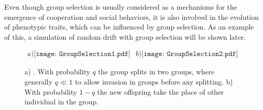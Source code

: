  
 Even though group selection is usually considered as a mechanisms for the emergence of cooperation and social behaviors, it is also involved in the evolution of phenotypic traits\cite{Wade1976,Traulsen2005}, which can be influenced by group selection. As an example of this, a simulation of random drift with group selection will be shown later.
 
  \begin{figure}[H]
\begin{center}$
\begin{array}{cc}
a)\texttt{[image: GroupSelection1.pdf]} &
b)\texttt{[image: GroupSelection2.pdf]}
\end{array}$
\end{center}
\caption{a) . With probability $q$ the group splits in two groups, where generally $q\ll 1$ to allow invasion in groups before any splitting. b) With probability $1-q$ the new offspring take the place of other individual in the group.}
\label{Fig5.2}
\end{figure}

